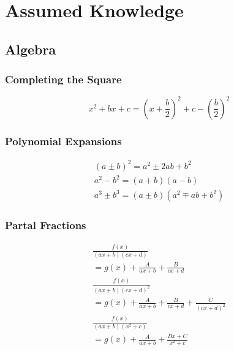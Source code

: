 \documentclass[../main]{subfiles}
\begin{document}
\section{Assumed Knowledge}

\subsection{Algebra}

	\subsubsection{Completing the Square}
	\[ x^2+bx+c = (x+\frac{b}{2})^2+c-(\frac{b}{2})^2 \]
	\subsubsection{Polynomial Expansions}
	\begin{equation*} \begin{gathered}
		(a\pm b)^2 = a^2 \pm 2ab + b^2 \\
		a^2 - b^2 = (a+b)(a-b) \\
		a^3 \pm b^3 = (a \pm b)(a^2 \mp ab + b^2)
	\end{gathered} \end{equation*}
	\subsubsection{Partal Fractions}
	\begin{equation*} \begin{gathered}
		\frac{f(x)}{(ax+b)(cx+d)} \\ = g(x) + \frac{A}{ax+b} + \frac{B}{cx+d} \\
		\frac{f(x)}{(ax+b)(cx+d)^2} \\ = g(x) + \frac{A}{ax+b} + \frac{B}{cx+d} + \frac{C}{(cx+d)^2} \\
		\frac{f(x)}{(ax+b)(x^2+c)} \\ = g(x) + \frac{A}{ax+b} + \frac{Bx+C}{x^2+c}
	\end{gathered} \end{equation*}
\end{document}
